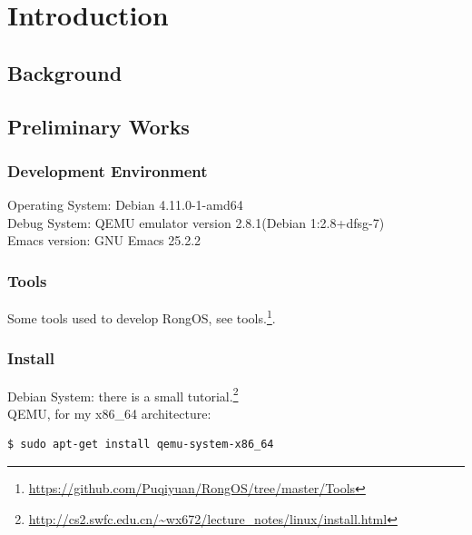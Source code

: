 \documentclass{swfcthesisp}
\begin{document}
\makepreliminarypages%
\frontmatter          
\tableofcontents     %
\listoffigures       %
\listoftables        %
\mainmatter
\chapter{Introduction}

\section{Background}
\label{sec:background}


\section{Preliminary Works}

\subsection{Development Environment}
\label{sec:devel-envir}

Operating System: Debian 4.11.0-1-amd64 \\
\hspace*{0.8cm}Debug System: QEMU emulator version 2.8.1(Debian 1:2.8+dfsg-7)\\
\hspace*{0.8cm}Emacs version: GNU Emacs 25.2.2

\subsection{Tools}
\label{sec:tools}

Some tools used to develop RongOS, see
tools.\footnote{\url{https://github.com/Puqiyuan/RongOS/tree/master/Tools}}.

\subsection{Install}
\label{sec:install}

Debian System: there is a small
tutorial.\footnote{\url{http://cs2.swfc.edu.cn/~wx672/lecture_notes/linux/install.html}}\\
\hspace*{0.8cm}QEMU, for my x86\_64 architecture: 
\begin{lstlisting}[language=bash]
     $ sudo apt-get install qemu-system-x86_64
\end{lstlisting}
\end{document}
